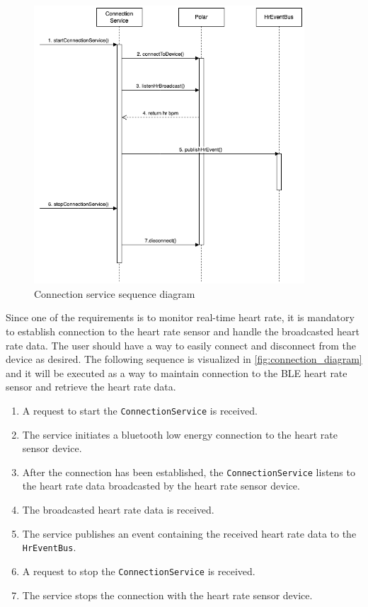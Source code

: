 \begin{figure}[H]
    \centering
    \includegraphics[width=0.9\textwidth]{diagrams/connection-service-onStart.drawio.png}
    \caption{Connection service sequence diagram}
    \label{fig:connection_diagram}
\end{figure}
Since one of the requirements is to monitor real-time heart rate, it is mandatory to establish connection to the heart rate sensor and handle the broadcasted heart rate data. The user should have a way to easily connect and disconnect from the device as desired.
The following sequence is visualized in \autoref{fig:connection_diagram} and it will be executed as a way to maintain connection to the BLE heart rate sensor and retrieve the heart rate data.
\begin{enumerate}
    \item A request to start the \texttt{ConnectionService} is received.
    \item The service initiates a bluetooth low energy connection to the heart rate sensor device.
    \item After the connection has been established, the \texttt{ConnectionService} listens to the heart rate data broadcasted by the heart rate sensor device.
    \item The broadcasted heart rate data is received.
    \item The service publishes an event containing the received heart rate data to the \texttt{HrEventBus}.
    \item A request to stop the \texttt{ConnectionService} is received.
    \item The service stops the connection with the heart rate sensor device.
\end{enumerate}

